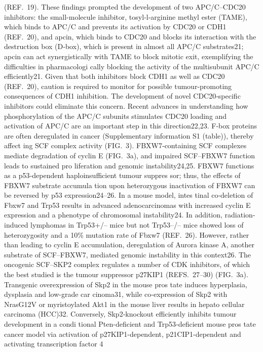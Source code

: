 (REF. 19). These findings prompted the development of
two APC/C–CDC20 inhibitors: the small-molecule
inhibitor, tosyl‑l‑arginine methyl ester (TAME), which
binds to APC/C and prevents its activation by CDC20 or
CDH1 (REF. 20), and apcin, which binds to CDC20 and
blocks its interaction with the destruction box (D‑box),
which is present in almost all APC/C substrates21; apcin
can act synergistically with TAME to block mitotic
exit, exemplifying the difficulties in pharmacologi­
cally blocking the activity of the multisubunit APC/C
efficiently21. Given that both inhibitors block CDH1 as
well as CDC20 (REF. 20), caution is required to monitor
for possible tumour-promoting consequences of CDH1
inhibition. The development of novel CDC20‑specific
inhibitors could eliminate this concern. Recent advances
in understanding how phosphorylation of the APC/C
subunits stimulates CDC20 loading and activation of
APC/C are an important step in this direction22,23.
F‑box proteins are often deregulated in cancer
(Supplementary information S1 (table)), thereby affect­
ing SCF complex activity (FIG. 3). FBXW7‑containing SCF
complexes mediate degradation of cyclin E (FIG. 3a), and
impaired SCF–FBXW7 function leads to sustained pro­
liferation and genomic instability24,25. FBXW7 functions
as a p53‑dependent haploinsufficient tumour suppres­
sor; thus, the effects of FBXW7 substrate accumula­
tion upon heterozygous inactivation of FBXW7 can be
reversed by p53 expression24–26. In a mouse model, intes­
tinal co‑deletion of Fbxw7 and Trp53 results in advanced
adenocarcinomas with increased cyclin E expression and
a phenotype of chromosomal instability24. In addition,
radiation-induced lymphomas in Trp53+/– mice but not
Trp53–/– mice showed loss of heterozygosity and a 10\%
mutation rate of Fbxw7 (REF. 26). However, rather than
leading to cyclin E accumulation, deregulation of Aurora
kinase A, another substrate of SCF–FBXW7, mediated
genomic instability in this context26.
The oncogenic SCF–SKP2 complex regulates a
number of CDK inhibitors, of which the best studied
is the tumour suppressor p27KIP1 (REFS. 27–30) (FIG. 3a).
Transgenic overexpression of Skp2 in the mouse pros­
tate induces hyperplasia, dysplasia and low-grade car­
cinoma31, while co‑expression of Skp2 with NrasG12V or
myristoylated Akt1 in the mouse liver results in hepato­
cellular carcinoma (HCC)32. Conversely, Skp2‑knockout
efficiently inhibits tumour development in a condi­
tional Pten-deficient and Trp53‑deficient mouse pros­
tate cancer model via activation of p27KIP1-dependent,
p21CIP1-dependent and activating transcription factor 4
